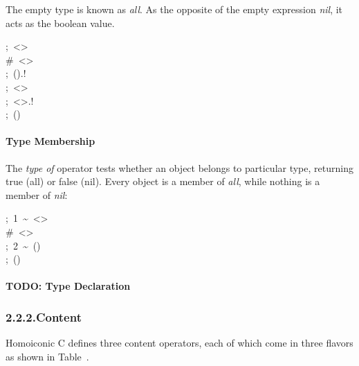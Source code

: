 \documentclass[preprint]{{acmart}}
\begin{document}
\noindent{}The empty type \mdcode{\textless{}\textgreater{}} is known as \emph{all}. As the opposite of the empty expression \mdcode{()} \emph{nil},
it acts as the boolean  value.%
\begin{mdpre}%
\noindent;~\textless{}\textgreater{}\\
{\#~\textless{}\textgreater{}}\\
;~().!\\
;~\textless{}\textgreater{}\\
;~\textless{}\textgreater{}.!\\
;~()%
\end{mdpre}
\paragraph{Type Membership}\label{sec-type-membership}%

\noindent{}The \emph{type of} operator \mdcode{\textasciitilde{}} tests whether an object belongs to particular
type, returning true (all) or false (nil). Every object is a member of
\emph{all}, while nothing is a member of \emph{nil}:%
\begin{mdpre}%
\noindent;~1~\textasciitilde{}~\textless{}\textgreater{}\\
{\#~\textless{}\textgreater{}}\\
;~2~\textasciitilde{}~()\\
;~()%
\end{mdpre}
\paragraph{TODO: Type Declaration}\label{sec-todo--type-declaration}%

\subsubsection{2.2.2.\hspace*{0.5em}Content}\label{sec-content}%

\noindent{}Homoiconic C defines three content operators, each of which come in three
flavors as shown in Table~.%
\end{document}

